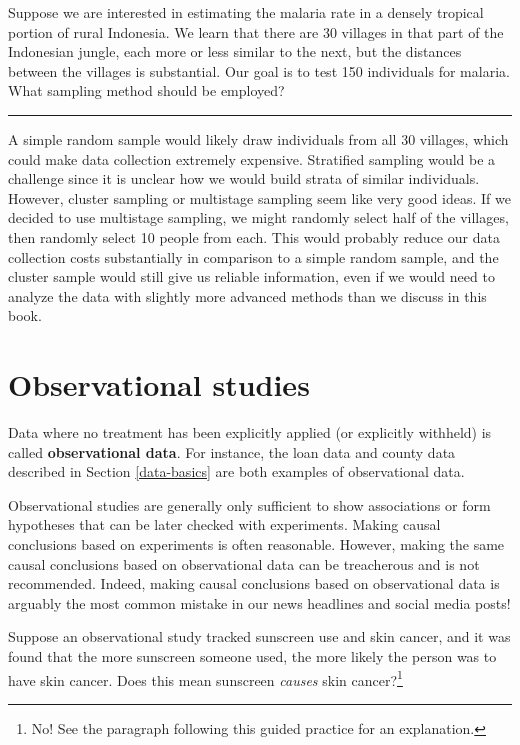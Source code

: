 \documentclass[
  10pt,
  openany]{book}
\theoremstyle{definition}
\theoremstyle{definition}
\theoremstyle{definition}
\theoremstyle{definition}
\theoremstyle{remark}
\begin{document}
Suppose we are interested in estimating the malaria rate in a densely tropical portion of rural Indonesia.
We learn that there are 30 villages in that part of the Indonesian jungle, each more or less similar to the next, but the distances between the villages is substantial. Our goal is to test 150 individuals for malaria.
What sampling method should be employed?

\begin{center}\rule{0.5\linewidth}{0.5pt}\end{center}

A simple random sample would likely draw individuals from all 30 villages, which could make data collection extremely expensive.
Stratified sampling would be a challenge since it is unclear how we would build strata of similar individuals.
However, cluster sampling or multistage sampling seem like very good ideas.
If we decided to use multistage sampling, we might randomly select half of the villages, then randomly select 10 people from each.
This would probably reduce our data collection costs substantially in comparison to a simple random sample, and the cluster sample would still give us reliable information, even if we would need to analyze the data with slightly more advanced methods than we discuss in this book.

\section{Observational studies}\label{observational-studies}

Data where no treatment has been explicitly applied (or explicitly withheld) is called \textbf{observational data}.
For instance, the loan data and county data described in Section \ref{data-basics} are both examples of observational data.

Observational studies are generally only sufficient to show associations or form hypotheses that can be later checked with experiments. Making causal conclusions based on experiments is often reasonable. However, making the same causal conclusions based on observational data can be treacherous and is not recommended. Indeed, making causal conclusions based on observational data is arguably the most common mistake in our news headlines and social media posts!

Suppose an observational study tracked sunscreen use and skin cancer, and it was found that the more sunscreen someone used, the more likely the person was to have skin cancer. Does this mean sunscreen \emph{causes} skin cancer?\footnote{No! See the paragraph following this guided practice for an explanation.}
\end{document}
